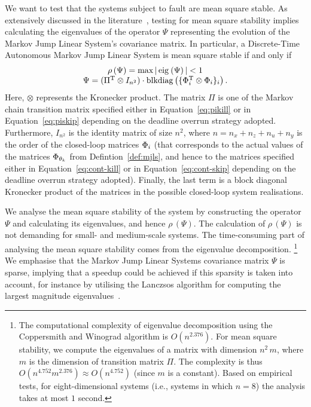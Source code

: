We want to test that the systems subject to fault are mean square stable.
As extensively discussed in the literature~\cite{Costa:2005}, testing for mean square stability implies calculating the eigenvalues of the operator $\Psi$ representing the evolution of the Markov Jump Linear System's covariance matrix.
In particular, a Discrete-Time Autonomous Markov Jump Linear System is mean square stable if and only if 
\begin{equation}%
    \label{eq:stab-notion}%
    \begin{matrix}
        \rho\,(\Psi) = \max{\abs{\,\eig{}{\Psi}\,}} < 1 \\
        \Psi = (\Pi^\T \otimes I_{n^2}) \cdot \blkdiag{\{ \clmat_{i}^\T \otimes \clmat_{i} \}_{i}}.
    \end{matrix}
\end{equation}
Here, $\otimes$ represents the Kronecker product.
The matrix $\Pi$ is one of the Markov chain transition matrix specified either in Equation~\eqref{eq:pikill} or in Equation~\eqref{eq:piskip} depending on the deadline overrun strategy adopted.
Furthermore, $I_{n^2}$ is the identity matrix of size $n^2$, where $n = n_x + n_z + n_u + n_y$ is the order of the closed-loop matrices $\Phi_{i}$ (that corresponds to the actual values of the matrices $\Phi_{\theta_k}$ from Defintion~\ref{def:mjls}, and hence to the matrices specified either in Equation~\eqref{eq:cont-kill} or in Equation~\eqref{eq:cont-skip} depending on the deadline overrun strategy adopted).
Finally, the last term is a block diagonal Kronecker product of the matrices in the possible closed-loop system realisations.

We analyse the mean square stability of the system by constructing the operator $\Psi$ and calculating its eigenvalues, and hence $\rho\,(\Psi)$.
The calculation of $\rho\,(\Psi)$ is not demanding for small- and medium-scale systems.
The time-consuming part of analysing the mean square stability comes from the eigenvalue decomposition.%
\footnote{%
The computational complexity of eigenvalue decomposition using the Coppersmith and Winograd algorithm is $O(n^{2.376})$.
For mean square stability, we compute the eigenvalues of a matrix with dimension $n^2\,m$, where $m$ is the dimension of transition matrix $\Pi$.
The complexity is thus $O(n^{4.752}m^{2.376}) \approx O(n^{4.752})$ (since $m$ is a constant).
Based on empirical tests, for eight-dimensional systems (i.e., systems in which $n=8$) the analysis takes at most $1$ second.
}
We emphasise that the Markov Jump Linear Systems covariance matrix $\Psi$ is sparse, implying that a speedup could be achieved if this sparsity is taken into account, for instance by utilising the Lanczsos algorithm for computing the largest magnitude eigenvalues~\cite{Golub:1996}.

